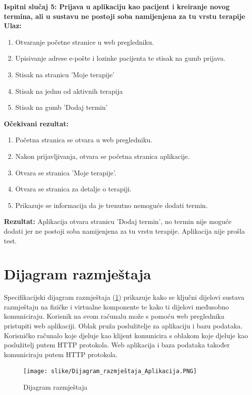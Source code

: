 \textbf{Ispitni slučaj 5: Prijava u aplikaciju kao pacijent i kreiranje novog termina, ali u sustavu ne postoji soba namijenjena za tu vrstu terapije}
\textbf{Ulaz:}
\begin{enumerate}
    \item Otvaranje početne stranice u web pregledniku.
    \item Upisivanje adrese e-pošte i lozinke pacijenta te stisak na gumb prijava.
    \item Stisak na stranicu 'Moje terapije'
    \item Stisak na jednu od aktivnih terapija
    \item Stisak na gumb 'Dodaj termin'
\end{enumerate}
\textbf{Očekivani rezultat:}
\begin{enumerate}
    \item Početna stranica se otvara u web pregledniku.   
    \item Nakon prijavljivanja, otvara se početna stranica aplikacije.
    \item Otvara se stranica 'Moje terapije'.
    \item Otvara se stranica za detalje o terapiji.
    \item Prikazuje se informacija da je trenutno nemoguće dodati termin.
\end{enumerate}
\textbf{Rezultat:} Aplikacija otvara stranicu 'Dodaj termin', no termin nije moguće dodati jer ne postoji soba namijenjena za tu vrstu terapije. Aplikacija nije prošla test.
			 

		
		
		\section{Dijagram razmještaja}
			
			 Specifikacijski dijagram razmještaja (\ref{fig:dijagram_razmjestaja1}) prikazuje kako se ključni dijelovi sustava razmještaju na fizičke i virtualne komponente te kako ti dijelovi međusobno komuniciraju.
			 Korisnik na svom računalu može s pomoću web preglednika pristupiti web aplikaciji. Oblak pruža poslužitelje za aplikaciju i bazu podataka. Korisničko računalo koje djeluje kao klijent komunicira s oblakom koje djeluje kao poslužitelj putem HTTP protokola. Web aplikacija i baza podataka također komuniciraju putem HTTP protokola.
			 
			 \begin{figure}[H]
				\texttt{[image: slike/Dijagram\_razmještaja\_Aplikacija.PNG]} %
				\centering
				\caption{Dijagram razmještaja}
				\label{fig:dijagram_razmjestaja1}
			\end{figure}
			
